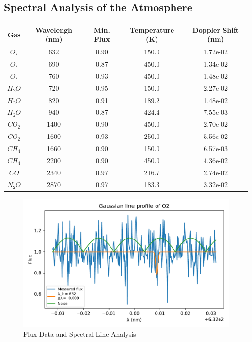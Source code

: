 \documentclass[reprint,english,notitlepage]{revtex4-2}
\begin{document}
\subsection{Spectral Analysis of the Atmosphere} \label{ssec: Analysis results}
\begin{table}[h!] \label{tab: Spec anal}
  \begin{tabular}{|c|*{4}{c|}}    
    \hline
    Gas  &Wavelengh (nm) &Min. Flux &Temperature (K) &Doppler Shift (nm) \\
    \hline
    $ O_{2} $ &632 &0.90 &150.0 &1.72e-02 \\
    \hline
    $ O_{2} $ &690 &0.87 &450.0 &1.34e-02 \\
    \hline
    $ O_{2} $ &760 &0.93 &450.0 &1.48e-02 \\
    \hline
    $ H_{2}O $ &720 &0.95 &150.0 &2.27e-02 \\
    \hline
    $ H_{2}O $ &820 &0.91 &189.2 &1.48e-02 \\
    \hline
    $ H_{2} O$ &940 &0.87 &424.4 &7.55e-03 \\
    \hline
    $ CO_{2} $ &1400 &0.90 &450.0 &2.70e-02 \\
    \hline
    $ CO_{2} $ &1600 &0.93 &250.0 &5.56e-02 \\
    \hline
    $ CH_{4} $ &1660 &0.90 &150.0 &6.57e-03 \\
    \hline
    $ CH_{4} $ &2200 &0.90 &450.0 &4.36e-02 \\
    \hline
    $ CO $ &2340 &0.97 &216.7 &2.74e-02 \\
    \hline
    $ N_{2}O $ &2870 &0.97 &183.3 &3.32e-02 \\
    \hline
    \end{tabular}
  \end{table}
  \twocolumngrid
  
  \clearpage
  \begin{figure}[h!]  
    \centering
    \includegraphics[scale =.5]{Figures/O2 632.pdf}
    \caption{Flux Data and Spectral Line Analysis}
    \label{fig: O2 632}
\end{figure}
\end{document}

